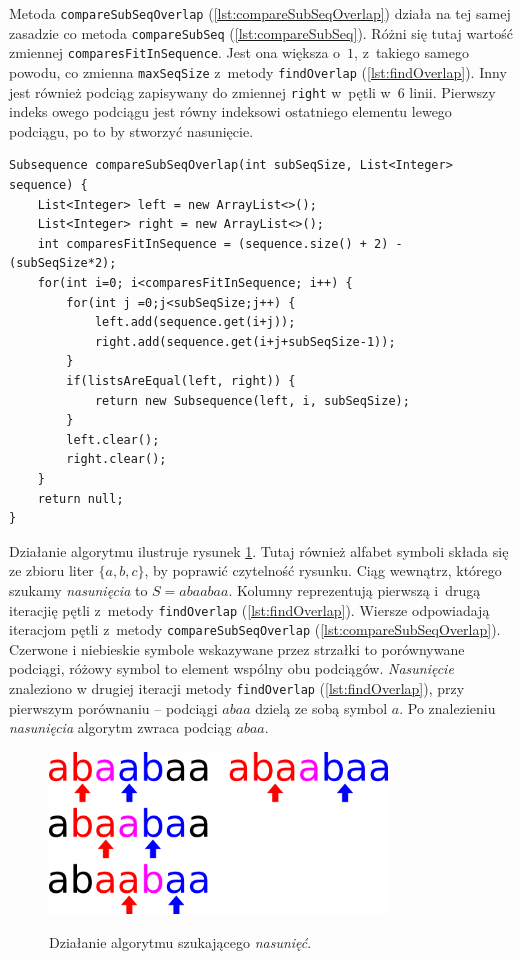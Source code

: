 \documentclass[document]{xmgr}
\begin{document}
Metoda \texttt{compareSubSeqOverlap} (\ref{lst:compareSubSeqOverlap}) działa na tej samej zasadzie co metoda \texttt{compareSubSeq} (\ref{lst:compareSubSeq}). Różni się tutaj wartość zmiennej \texttt{comparesFitInSequence}. Jest ona większa o~$1$, z~takiego samego powodu, co zmienna \texttt{max\-SeqSize} z~metody \texttt{findOverlap} (\ref{lst:findOverlap}). Inny jest również podciąg zapisywany do zmiennej \mbox{\texttt{right}} w~pętli w~6 linii. Pierwszy indeks owego podciągu jest równy indeksowi ostatniego elementu lewego podciągu, po to by stworzyć nasunięcie.
\newpage
\begin{lstlisting}[caption={Metoda pomocnicza przy szukaniu \emph{nasunięć} wewnątrz listy.},label=lst:compareSubSeqOverlap]
Subsequence compareSubSeqOverlap(int subSeqSize, List<Integer> sequence) {
	List<Integer> left = new ArrayList<>();
	List<Integer> right = new ArrayList<>();
	int comparesFitInSequence = (sequence.size() + 2) - (subSeqSize*2);
	for(int i=0; i<comparesFitInSequence; i++) {
		for(int j =0;j<subSeqSize;j++) {
			left.add(sequence.get(i+j));
			right.add(sequence.get(i+j+subSeqSize-1));
		}
		if(listsAreEqual(left, right)) {
			return new Subsequence(left, i, subSeqSize);
		}
		left.clear();
		right.clear();
	}
	return null;
} 
\end{lstlisting}

Działanie algorytmu ilustruje rysunek \ref{fig:overlapFinding}. Tutaj również alfabet symboli składa się ze zbioru liter $\{a, b, c\}$, by poprawić czytelność rysunku. Ciąg wewnątrz, którego szukamy \emph{nasunięcia} to $S=abaabaa$. Kolumny reprezentują pierwszą i~drugą iteracjię pętli z~metody \texttt{findOverlap} (\ref{lst:findOverlap}). Wiersze odpowiadają iteracjom pętli z~metody \texttt{compareSubSeqOverlap} (\ref{lst:compareSubSeqOverlap}). Czerwone i niebieskie symbole wskazywane przez strzałki to porównywane podciągi, różowy symbol to element wspólny obu podciągów. \emph{Nasunięcie} znaleziono w drugiej iteracji metody \texttt{findOverlap} (\ref{lst:findOverlap}), przy pierwszym porównaniu -- podciągi $abaa$ dzielą ze sobą symbol $a$. Po znalezieniu \emph{nasunięcia} algorytm zwraca podciąg $abaa$.

\begin{figure}[tbh]
    \centering
    \caption{Działanie algorytmu szukającego \emph{nasunięć}.}
    \includegraphics[width = 0.8\textwidth]{images/overlapFinding}
    \label{fig:overlapFinding}
\end{figure}
\end{document}
